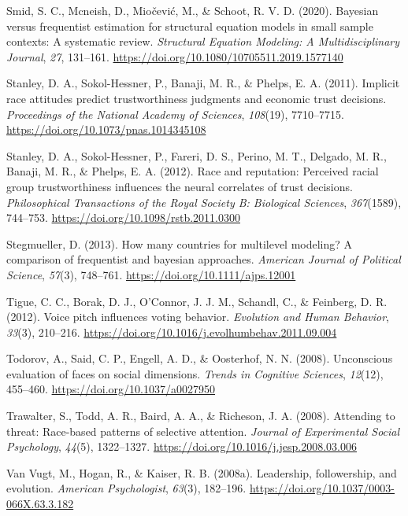 \documentclass[
  english,
  man]{apa6}
\begin{document}
\leavevmode\hypertarget{ref-Smid2020}{}%
Smid, S. C., Mcneish, D., Miočević, M., \& Schoot, R. V. D. (2020). Bayesian versus frequentist estimation for structural equation models in small sample contexts: A systematic review. \emph{Structural Equation Modeling: A Multidisciplinary Journal}, \emph{27}, 131--161. \url{https://doi.org/10.1080/10705511.2019.1577140}

\leavevmode\hypertarget{ref-Stanley2011}{}%
Stanley, D. A., Sokol-Hessner, P., Banaji, M. R., \& Phelps, E. A. (2011). Implicit race attitudes predict trustworthiness judgments and economic trust decisions. \emph{Proceedings of the National Academy of Sciences}, \emph{108}(19), 7710--7715. \url{https://doi.org/10.1073/pnas.1014345108}

\leavevmode\hypertarget{ref-Stanley2012}{}%
Stanley, D. A., Sokol-Hessner, P., Fareri, D. S., Perino, M. T., Delgado, M. R., Banaji, M. R., \& Phelps, E. A. (2012). Race and reputation: Perceived racial group trustworthiness influences the neural correlates of trust decisions. \emph{Philosophical Transactions of the Royal Society B: Biological Sciences}, \emph{367}(1589), 744--753. \url{https://doi.org/10.1098/rstb.2011.0300}

\leavevmode\hypertarget{ref-Stegmueller2013}{}%
Stegmueller, D. (2013). How many countries for multilevel modeling? A comparison of frequentist and bayesian approaches. \emph{American Journal of Political Science}, \emph{57}(3), 748--761. \url{https://doi.org/10.1111/ajps.12001}

\leavevmode\hypertarget{ref-Tigue2012}{}%
Tigue, C. C., Borak, D. J., O'Connor, J. J. M., Schandl, C., \& Feinberg, D. R. (2012). Voice pitch influences voting behavior. \emph{Evolution and Human Behavior}, \emph{33}(3), 210--216. \url{https://doi.org/10.1016/j.evolhumbehav.2011.09.004}

\leavevmode\hypertarget{ref-Todorov2008}{}%
Todorov, A., Said, C. P., Engell, A. D., \& Oosterhof, N. N. (2008). Unconscious evaluation of faces on social dimensions. \emph{Trends in Cognitive Sciences}, \emph{12}(12), 455--460. \url{https://doi.org/10.1037/a0027950}

\leavevmode\hypertarget{ref-Trawalter2008}{}%
Trawalter, S., Todd, A. R., Baird, A. A., \& Richeson, J. A. (2008). Attending to threat: Race-based patterns of selective attention. \emph{Journal of Experimental Social Psychology}, \emph{44}(5), 1322--1327. \url{https://doi.org/10.1016/j.jesp.2008.03.006}

\leavevmode\hypertarget{ref-VanVugt2008a}{}%
Van Vugt, M., Hogan, R., \& Kaiser, R. B. (2008a). Leadership, followership, and evolution. \emph{American Psychologist}, \emph{63}(3), 182--196. \url{https://doi.org/10.1037/0003-066X.63.3.182}
\end{document}
